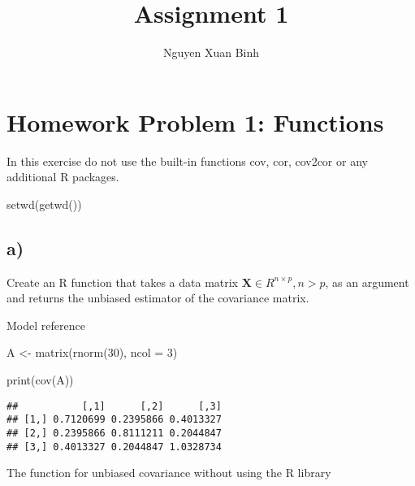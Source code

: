 \documentclass[
]{article}
\title{Assignment 1}
\author{Nguyen Xuan Binh}
\date{}
\newenvironment{Shaded}{\begin{snugshade}}{\end{snugshade}}
\newcommand{\AttributeTok}[1]{\textcolor[rgb]{0.77,0.63,0.00}{#1}}
\newcommand{\DecValTok}[1]{\textcolor[rgb]{0.00,0.00,0.81}{#1}}
\newcommand{\FunctionTok}[1]{\textcolor[rgb]{0.00,0.00,0.00}{#1}}
\newcommand{\NormalTok}[1]{#1}
\newcommand{\OtherTok}[1]{\textcolor[rgb]{0.56,0.35,0.01}{#1}}
\begin{document}
\maketitle

\hypertarget{homework-problem-1-functions}{%
\section{Homework Problem 1:
Functions}\label{homework-problem-1-functions}}

In this exercise do not use the built-in functions cov, cor, cov2cor or
any additional R packages.\\

\begin{Shaded}
\begin{Highlighting}[]
\FunctionTok{setwd}\NormalTok{(}\FunctionTok{getwd}\NormalTok{())}
\end{Highlighting}
\end{Shaded}

\hypertarget{a}{%
\subsection{a)}\label{a}}

Create an R function that takes a data matrix
\(\textbf{X} \in R^{n\times p}, n > p\), as an argument and returns the
unbiased estimator of the covariance matrix.

Model reference

\begin{Shaded}
\begin{Highlighting}[]
\NormalTok{A }\OtherTok{\textless{}{-}} \FunctionTok{matrix}\NormalTok{(}\FunctionTok{rnorm}\NormalTok{(}\DecValTok{30}\NormalTok{), }\AttributeTok{ncol =} \DecValTok{3}\NormalTok{)}

\FunctionTok{print}\NormalTok{(}\FunctionTok{cov}\NormalTok{(A))}
\end{Highlighting}
\end{Shaded}

\begin{verbatim}
##           [,1]      [,2]      [,3]
## [1,] 0.7120699 0.2395866 0.4013327
## [2,] 0.2395866 0.8111211 0.2044847
## [3,] 0.4013327 0.2044847 1.0328734
\end{verbatim}

The function for unbiased covariance without using the R library
\end{document}
